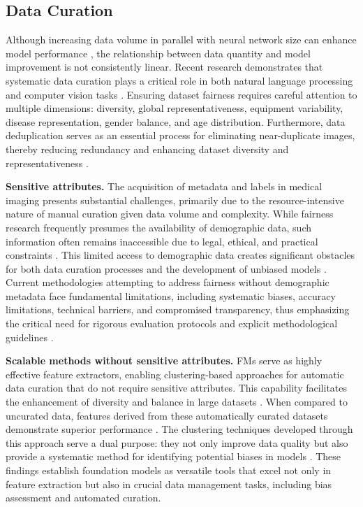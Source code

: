 \subsection{Data Curation}
Although increasing data volume in parallel with neural network size can enhance model performance \cite{goyal_self-supervised_2021, goyal_vision_2022}, the relationship between data quantity and model improvement is not consistently linear. Recent research demonstrates that systematic data curation plays a critical role in both natural language processing and computer vision tasks \cite{deitke_molmo_2024, oquab_dinov2_2024}. Ensuring dataset fairness requires careful attention to multiple dimensions: diversity, global representativeness, equipment variability, disease representation, gender balance, and age distribution. Furthermore, data deduplication serves as an essential process for eliminating near-duplicate images, thereby reducing redundancy and enhancing dataset diversity and representativeness \cite{oquab_dinov2_2024, lee_deduplicating_2022}.

\textbf{Sensitive attributes.} The acquisition of metadata and labels in medical imaging presents substantial challenges, primarily due to the resource-intensive nature of manual curation given data volume and complexity. While fairness research frequently presumes the availability of demographic data, such information often remains inaccessible due to legal, ethical, and practical constraints \cite{andrus_demographic-reliant_2022}. This limited access to demographic data creates significant obstacles for both data curation processes and the development of unbiased models \cite{queiroz_using_2025}. Current methodologies attempting to address fairness without demographic metadata face fundamental limitations, including systematic biases, accuracy limitations, technical barriers, and compromised transparency, thus emphasizing the critical need for rigorous evaluation protocols and explicit methodological guidelines \cite{ashurst_fairness_2023}.

\textbf{Scalable methods without sensitive attributes.} FMs serve as highly effective feature extractors, enabling clustering-based approaches for automatic data curation that do not require sensitive attributes. This capability facilitates the enhancement of diversity and balance in large datasets \cite{vo_automatic_2024, queiroz_using_2025}. When compared to uncurated data, features derived from these automatically curated datasets demonstrate superior performance \cite{vo_automatic_2024}. The clustering techniques developed through this approach serve a dual purpose: they not only improve data quality but also provide a systematic method for identifying potential biases in models \cite{queiroz_using_2025}. These findings establish foundation models as versatile tools that excel not only in feature extraction but also in crucial data management tasks, including bias assessment and automated curation.


